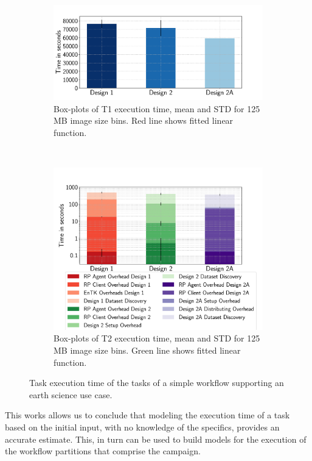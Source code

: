 \begin{figure}[ht!]
    \centering
    \begin{subfigure}[b]{0.45\textwidth}
        \includegraphics[width=\linewidth]{figures/ttx.pdf}
        \caption{Box-plots of T1 execution time, mean and STD for 125 MB image size bins. Red line shows fitted linear function.}
    \end{subfigure}%
    ~ 
    \begin{subfigure}[b]{0.45\textwidth}
        \includegraphics[width=\linewidth]{figures/overheads.pdf}
        \caption{Box-plots of T2 execution time, mean and STD for 125 MB image size bins. Green line shows fitted linear function.}
    \end{subfigure}
    \caption{Task execution time of the tasks of a simple workflow supporting an earth science use case.}
    \label{fig:sealfitting}
\end{figure}

This works allows us to conclude that modeling the execution time of a task based on the initial input, with no knowledge of the specifics, provides an accurate estimate. 
This, in turn can be used to build models for the execution of the workflow partitions that comprise the campaign.

